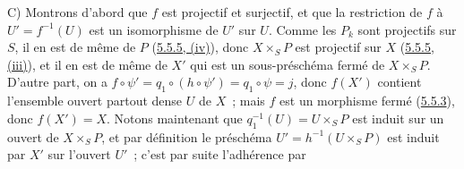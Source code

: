 C) Montrons d'abord que $f$ est projectif et surjectif, et que la restriction
de $f$ à $U'=f^{-1}(U)$ est un isomorphisme de $U'$ sur $U$. Comme les $P_k$
sont projectifs sur $S$, il en est de même de $P$
(\hyperref[II.5.5.5-fr]{5.5.5, (iv)}), donc $X\times_SP$ est projectif sur
$X$ (\hyperref[II.5.5.5-fr]{5.5.5, (iii)}), et il en est de même de $X'$ qui
est un sous-préschéma fermé de $X\times_SP$. D'autre part, on a
$f\circ\psi'=q_1\circ(h\circ\psi')=q_1\circ\psi=j$, donc $f(X')$ contient
l'ensemble ouvert partout dense $U$ de $X$~; mais $f$ est un morphisme fermé
(\hyperref[II.5.5.3-fr]{5.5.3}), donc $f(X')=X$. Notons maintenant que
$q_1^{-1}(U)=U\times_SP$ est induit sur un ouvert de $X\times_SP$, et par
définition le préschéma $U'=h^{-1}(U\times_SP)$ est induit par $X'$ sur
l'ouvert $U'$~; c'est par suite l'adhérence par

